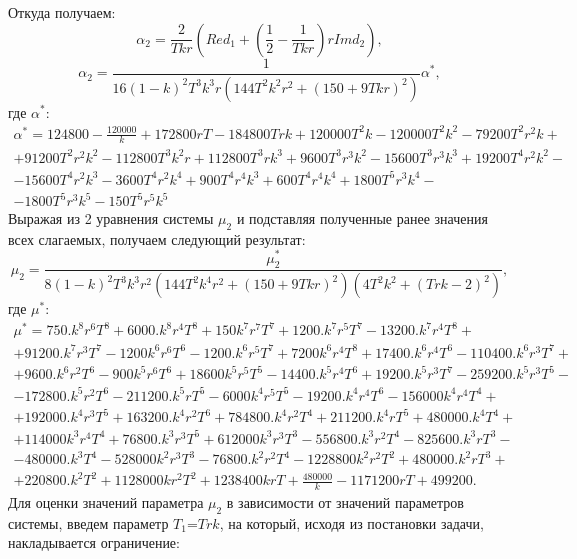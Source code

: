 \documentclass[12pt]{article}
\begin{document}
Откуда получаем:
\begin{equation*}
    \alpha_2 =\frac{2}{T k r}\left( Re d_1 + \left(\frac{1}{2}-\frac{1}{T k r}\right) r Im d_2\right),
\end{equation*}
\begin{equation*}
 \alpha_2 =\frac{1}{16 (1-k)^2 T^3 k^3 r(144 T^2 k^2 r^2 + (150+9 T k r)^2)} \alpha^*,
\end{equation*}
где $\alpha^*$:
\begin{multline*}
    \alpha^*=124800-\frac{120000}{k}+172800 r T -184800 T r k+120000 T^2 k - 120000 T^2 k^2 - 79200 T^2 r^2 k +\\+91200 T^2 r^2 k^2 -112800 T^3 k^2 r +112800 T^3 r k^3 + 9600 T^3 r^3 k^2 -15600 T^3 r^3 k^3 + 19200 T^4 r^2 k^2 -\\-15600 T^4 r^2 k^3 -3600 T^4 r^2 k^4 +900 T^4 r^4 k^3 +600 T^4 r^4 k^4 + 1800 T^5 r^3 k^4-\\ -1800 T^5 r^3 k^5 -150 T^5 r^5 k^5
\end{multline*}
 Выражая из 2 уравнения системы $\mu_2$ и подставляя полученные ранее значения всех слагаемых, получаем следующий результат:
 \begin{equation}
 \mu_2 =\frac{\mu_2^*}{8(1-k)^2 T^3 k^3 r^2 (144 T^2 k^4 r^2 + (150+9 T k r)^2)(4 T^2 k^2 + (T r k - 2)^2)} ,
\end{equation}
где $\mu^*$:
\begin{multline*}
    \mu^*=750. k^8 r^6 T^8+6000. k^8 r^4 T^8+150 k^7 r^7 T^7+1200. k^7 r^5 T^7-13200. k^7 r^4 T^8+\\+91200. k^7 r^3 T^7-1200 k^6 r^6 T^6-1200. k^6 r^5 T^7+7200 k^6 r^4 T^8+17400. k^6 r^4 T^6-110400. k^6 r^3 T^7+\\+9600. k^6 r^2 T^6-900 k^5 r^6 T^6+18600 k^5 r^5 T^5-14400. k^5 r^4 T^6+19200. k^5 r^3 T^7-259200. k^5 r^3 T^5-\\-172800. k^5 r^2 T^6-211200. k^5 r T^5-6000 k^4 r^5 T^5-19200. k^4 r^4 T^6-156000 k^4 r^4 T^4+\\+192000. k^4 r^3 T^5+163200. k^4 r^2 T^6+784800. k^4 r^2 T^4+211200. k^4 r T^5+480000. k^4 T^4+\\+114000 k^3 r^4 T^4+76800. k^3 r^3 T^5+612000 k^3 r^3 T^3-556800. k^3 r^2 T^4-825600. k^3 r T^3-\\-480000. k^3 T^4-528000 k^2 r^3 T^3-76800. k^2 r^2 T^4-1228800 k^2 r^2 T^2+480000. k^2 r T^3+\\+220800. k^2 T^2+1128000 k r^2 T^2+1238400 k r T+\frac{480000}{k}-1171200 r T+499200.
\end{multline*}
Для оценки значений параметра $\mu_2$ в зависимости от значений  параметров системы, введем параметр $T_1$=$T r k$, на который, исходя из постановки задачи, накладывается ограничение:
\end{document}
